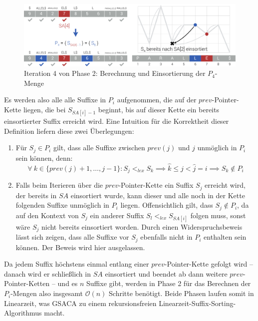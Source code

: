 \documentclass[twoside,a4paper,11pt]{article}
\theoremstyle{break}
\begin{document}
\hline
\begin{figure}[h]
	\centering
	\includegraphics[width=\linewidth,bb=0 0 1310 386]{./assets/phase2-4.pdf}
	\caption{Iteration 4 von Phase 2: Berechnung und Einsortierung der $P_4$-Menge}
\label{fig:phase2-4}
\end{figure}

Es werden also alle alle Suffixe in $P_i$ aufgenommen, die auf der $prev$-Pointer-Kette liegen, die bei $S_{SA[i] - 1}$ beginnt, bis auf dieser Kette ein bereits einsortierter Suffix erreicht wird. Eine Intuition für die Korrektheit dieser Definition liefern diese zwei Überlegungen:

\begin{enumerate}
	\item Für $S_j \in P_i$ gilt, dass alle Suffixe zwischen $prev(j)$ und $j$ unmöglich in $P_i$ sein können, denn: $$\forall\ k \in \{ prev(j) + 1, \dots, j - 1 \}: S_j <_{lex} S_k \implies \widehat{k} \le j < \widehat{j} = i \implies S_k \notin P_i$$
	\item Falls beim Iterieren über die $prev$-Pointer-Kette ein Suffix $S_j$ erreicht wird, der bereits in $SA$ einsortiert wurde, kann dieser und alle noch in der Kette folgenden Suffixe unmöglich in $P_i$ liegen. Offensichtlich gilt, dass $S_j \notin P_i$, da auf den Kontext von $S_j$ ein anderer Suffix $S_l <_{lex} S_{SA[i]}$ folgen muss, sonst wäre $S_j$ nicht bereits einsortiert worden. Durch einen Widerspruchsbeweis lässt sich zeigen, dass alle Suffixe vor $S_j$ ebenfalls nicht in $P_i$ enthalten sein können. Der Beweis wird hier ausgelassen.
\end{enumerate}

Da jedem Suffix höchstens einmal entlang einer $prev$-Pointer-Kette gefolgt wird – danach wird er schließlich in $SA$ einsortiert und beendet ab dann weitere $prev$-Pointer-Ketten – und es $n$ Suffixe gibt, werden in Phase 2 für das Berechnen der $P_i$-Mengen also insgesamt $\mathcal{O}(n)$ Schritte benötigt. Beide Phasen laufen somit in Linearzeit, was GSACA zu einem rekursionsfreien Linearzeit-Suffix-Sorting-Algorithmus macht.
\end{document}
